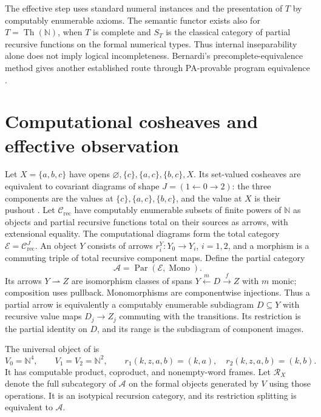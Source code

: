 \documentclass[11pt]{article}
\newcommand{\N}{\mathbb N}
\begin{document}
The effective step uses standard numeral instances and the presentation
of $T$ by computably enumerable axioms. The semantic functor exists also
for $T=\operatorname{Th}(\N)$, when $T$ is complete and $S_T$ is the
classical category of partial recursive functions on the formal numerical
types. Thus internal inseparability alone does not imply logical
incompleteness. Bernardi's precomplete-equivalence method gives another
established route through PA-provable program equivalence
\cite[pp.~125--128]{Bernardi}.

\section{Computational cosheaves and effective observation}\label{sec:cosheaves}

Let $X=\{a,b,c\}$ have opens
$\varnothing,\{c\},\{a,c\},\{b,c\},X$.
Its set-valued cosheaves are equivalent to covariant diagrams of shape
$J=(1\leftarrow0\to2)$: the three components are the values at
$\{c\},\{a,c\},\{b,c\}$, and the value at $X$ is their pushout
\cite[Section 2]{ThreePoint}.
Let $\mathcal C_{\mathrm{rec}}$ have computably enumerable subsets
of finite powers of $\N$ as objects and partial recursive functions
total on their sources as arrows, with extensional equality.
The computational diagrams form the total category
$\mathcal E=\mathcal C_{\mathrm{rec}}^J$.
An object $Y$ consists of arrows $r_i^Y:Y_0\to Y_i$, $i=1,2$,
and a morphism is a commuting triple of total recursive component maps.
Define the partial category
\[
 \mathcal A=\operatorname{Par}(\mathcal E,\operatorname{Mono}).
\]
Its arrows $Y\rightharpoonup Z$ are isomorphism classes of spans
$Y\xleftarrow{m}D\xrightarrow{f}Z$ with $m$ monic; composition
uses pullback. Monomorphisms are componentwise injections.
Thus a partial arrow is equivalently a computably enumerable
subdiagram $D\subseteq Y$ with recursive value maps $D_j\to Z_j$
commuting with the transitions. Its restriction is the partial
identity on $D$, and its range is the subdiagram of component images.

The universal object of \cite[Sections 4--5]{ThreePoint} is
\begin{equation}\label{eq:universal-fork}
 V_0=\N^4,\qquad V_1=V_2=\N^2,\qquad
 r_1(k,z,a,b)=(k,a),\quad r_2(k,z,a,b)=(k,b).
\end{equation}
It has computable product, coproduct, and nonempty-word frames.
Let $\mathscr R_X$ denote the full subcategory of $\mathcal A$
on the formal objects generated by $V$ using those operations.
It is an isotypical recursion category, and its restriction
splitting is equivalent to $\mathcal A$.
\end{document}
